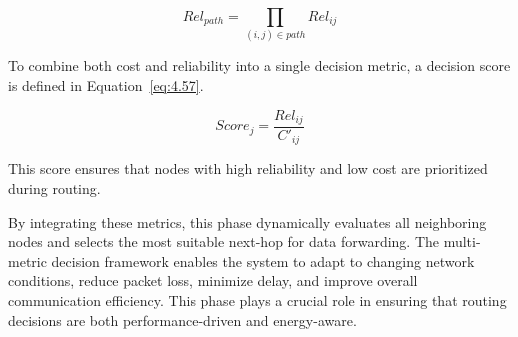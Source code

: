 \documentclass[a4paper,fleqn]{cas-dc}
\numberwithin{equation}{section}
\begin{document}
\begin{equation}
Rel_{path} = \prod_{(i,j) \in path} Rel_{ij}
\label{eq:4.56}
\end{equation}

To combine both cost and reliability into a single decision metric, a decision score is defined in Equation~\ref{eq:4.57}.

\begin{equation}
Score_j = \frac{Rel_{ij}}{C'_{ij}}
\label{eq:4.57}
\end{equation}

This score ensures that nodes with high reliability and low cost are prioritized during routing.

By integrating these metrics, this phase dynamically evaluates all neighboring nodes and selects the most suitable next-hop for data forwarding. The multi-metric decision framework enables the system to adapt to changing network conditions, reduce packet loss, minimize delay, and improve overall communication efficiency. This phase plays a crucial role in ensuring that routing decisions are both performance-driven and energy-aware.
\end{document}
